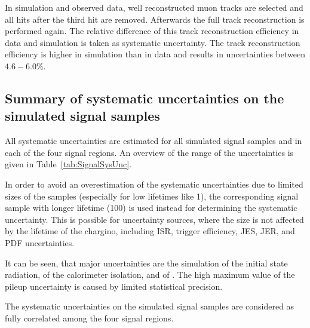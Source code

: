 In simulation and observed data, well reconstructed muon tracks are selected and all hits after the third hit are removed.
Afterwards the full track reconstruction is performed again.
The relative difference of this track reconstruction efficiency in data and simulation is taken as systematic uncertainty. %
The track reconstruction efficiency is higher in simulation than in data and results in uncertainties between $4.6-6.0\%$.\\


\subsection*{Summary of systematic uncertainties on the simulated signal samples}
All systematic uncertainties are estimated for all simulated signal samples and in each of the four signal regions.
An overview of the range of the uncertainties is given in Table~\ref{tab:SignalSysUnc}.

In order to avoid an overestimation of the systematic uncertainties due to limited sizes of the samples (especially for low lifetimes like 1\cm), the corresponding signal sample with longer lifetime (100\cm) is used instead for determining the systematic uncertainty.
This is possible for uncertainty sources, where the size is not affected by the lifetime of the chargino, including ISR, trigger efficiency, JES, JER, and PDF uncertainties.

It can be seen, that major uncertainties are the simulation of the initial state radiation, of the calorimeter isolation, and of \ias.
The high maximum value of the pileup uncertainty is caused by limited statistical precision.

The systematic uncertainties on the simulated signal samples are considered as fully correlated among the four signal regions.

